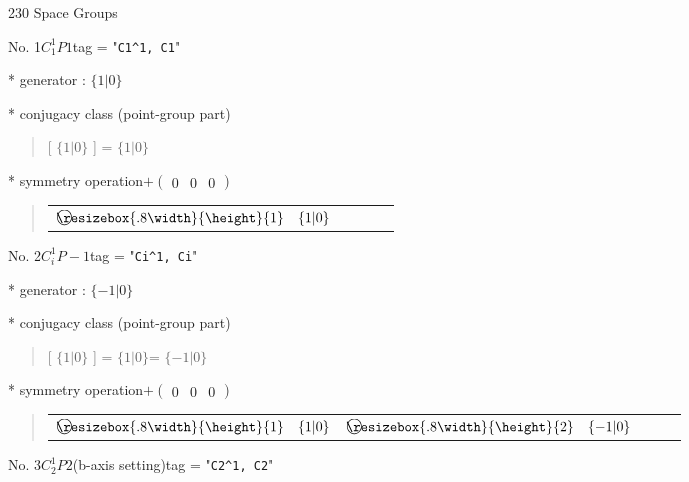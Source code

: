 \documentclass[fleqn,10pt,landscape]{jsarticle}
\begin{document}
\setcounter{MaxMatrixCols}{16}

\begin{center}
\LARGE
230 Space Groups
\end{center}

No. 1\quad$C_{1}^{1}$\quad$P1$\quad[ triclinic ]
tag = "{\tt C1^1, C1}"

* generator : $\{1|0\}$

* conjugacy class (point-group part)
\begin{quote}
[ $\{1|0\}$ ] = \quad $\{1|0\}$\newline
\end{quote}

* symmetry operation\quad$+\begin{pmatrix} 0 & 0 & 0 \end{pmatrix}$
\begin{quote}
\begin{tabular}{lllll}
$ {\ooalign{\hfil\resizebox{.8\width}{\height}{1}\hfil\crcr\raise.1ex\hbox{\large$\bigcirc$}}}\quad \{1|0\} $
\end{tabular}
\end{quote}


\newpage

No. 2\quad$C_{i}^{1}$\quad$P-1$\quad[ triclinic ]
tag = "{\tt Ci^1, Ci}"

* generator : $\{-1|0\}$

* conjugacy class (point-group part)
\begin{quote}
[ $\{1|0\}$ ] = \quad $\{1|0\}$\newline[ $\{-1|0\}$ ] = \quad $\{-1|0\}$\newline
\end{quote}

* symmetry operation\quad$+\begin{pmatrix} 0 & 0 & 0 \end{pmatrix}$
\begin{quote}
\begin{tabular}{lllll}
$ {\ooalign{\hfil\resizebox{.8\width}{\height}{1}\hfil\crcr\raise.1ex\hbox{\large$\bigcirc$}}}\quad \{1|0\} $ & $ {\ooalign{\hfil\resizebox{.8\width}{\height}{2}\hfil\crcr\raise.1ex\hbox{\large$\bigcirc$}}}\quad \{-1|0\} $
\end{tabular}
\end{quote}


\newpage

No. 3\quad$C_{2}^{1}$\quad$P2$\quad(b-axis setting)\quad[ monoclinic ]
tag = "{\tt C2^1, C2}"
\end{document}
